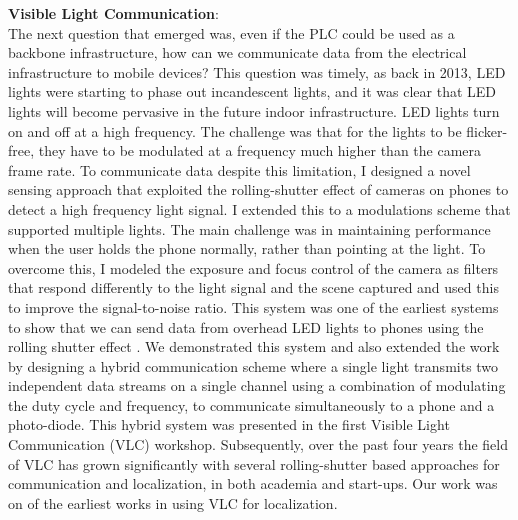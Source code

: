 \documentclass[10pt]{article}
\begin{document}
\textbf{Visible Light Communication}:\\ 

The next question that emerged was, even if the PLC could be used as a backbone infrastructure, how can we communicate data from the electrical infrastructure to mobile devices? This question was timely, as back in 2013, LED lights were starting to phase out incandescent lights, and it was clear that LED lights will become pervasive in the future indoor infrastructure. LED lights turn on and off at a high frequency. 
The challenge was that for the lights to be flicker-free, they have to be modulated at a frequency much higher than the camera frame rate. To communicate data despite this limitation, I designed a novel sensing approach that exploited the rolling-shutter effect of cameras on phones to detect a high frequency light signal. I extended this to a modulations scheme that supported multiple lights. The main challenge was in maintaining performance when the user holds the phone normally, rather than pointing at the light. To overcome this, I modeled the exposure and focus control of the camera as filters that respond differently to the light signal and the scene captured and used this to improve the signal-to-noise ratio. This system was one of the earliest systems to show that we can send data from overhead LED lights to phones using the rolling shutter effect \cite{rajagopal2014visual}.  We demonstrated this system \cite{rajagopal2014demonstration} and also extended the work \cite{rajagopal2014hybrid} by designing a hybrid communication scheme where a single light transmits two independent data streams on a single channel using a combination of modulating the duty cycle and frequency, to communicate simultaneously to a phone and a photo-diode. This hybrid system was presented in the first Visible Light Communication (VLC) workshop. Subsequently, over the past four years the field of VLC has grown significantly with several rolling-shutter based approaches for communication and localization, in both academia and start-ups. Our work was on of the earliest works in using VLC for localization.
\end{document}
